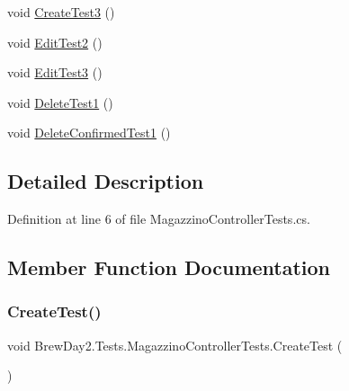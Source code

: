 \begin{DoxyCompactItemize}
\item 
void \mbox{\hyperlink{class_brew_day2_1_1_tests_1_1_magazzino_controller_tests_ab3ba91129f1bb3e422250d79256173dd}{Create\+Test3}} ()
\item 
void \mbox{\hyperlink{class_brew_day2_1_1_tests_1_1_magazzino_controller_tests_a82188b96f2702e8df1b675304cbd68d7}{Edit\+Test2}} ()
\item 
void \mbox{\hyperlink{class_brew_day2_1_1_tests_1_1_magazzino_controller_tests_a9adab74e7cf3dbaf8cb77b3f6fe2ae57}{Edit\+Test3}} ()
\item 
void \mbox{\hyperlink{class_brew_day2_1_1_tests_1_1_magazzino_controller_tests_a76eadee5027dafd8899e711b9fd335da}{Delete\+Test1}} ()
\item 
void \mbox{\hyperlink{class_brew_day2_1_1_tests_1_1_magazzino_controller_tests_aa9e502a1e12a38f9f4cfcd6836322db1}{Delete\+Confirmed\+Test1}} ()
\end{DoxyCompactItemize}


\subsection{Detailed Description}


Definition at line 6 of file Magazzino\+Controller\+Tests.\+cs.



\subsection{Member Function Documentation}
\mbox{\label{class_brew_day2_1_1_tests_1_1_magazzino_controller_tests_a88b6ff031fc2b5afb9e0494f29364332}} 
\subsubsection{\texorpdfstring{Create\+Test()}{CreateTest()}}
{\footnotesize\ttfamily void Brew\+Day2.\+Tests.\+Magazzino\+Controller\+Tests.\+Create\+Test (\begin{DoxyParamCaption}{ }\end{DoxyParamCaption})}



